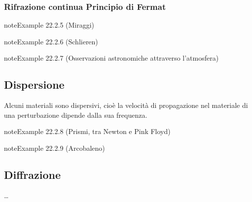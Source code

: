 \documentclass[letterpaper,10pt,italian]{jupyterBook}
\begin{document}
\subsubsection{Rifrazione continua \sphinxhyphen{} Principio di Fermat}
\label{\detokenize{ch/waves/optics-phenomena:rifrazione-continua-principio-di-fermat}}\label{ch/waves/optics-phenomena:example-4}
\begin{sphinxadmonition}{note}{Example 22.2.5 (Miraggi)}


\end{sphinxadmonition}
\label{ch/waves/optics-phenomena:example-5}
\begin{sphinxadmonition}{note}{Example 22.2.6 (Schlieren)}


\end{sphinxadmonition}
\label{ch/waves/optics-phenomena:example-6}
\begin{sphinxadmonition}{note}{Example 22.2.7 (Osservazioni astronomiche attraverso l’atmosfera)}


\end{sphinxadmonition}


\subsection{Dispersione}
\label{\detokenize{ch/waves/optics-phenomena:dispersione}}
\sphinxAtStartPar
Alcuni materiali sono dispersivi, cioè la velocità di propagazione nel materiale di una perturbazione dipende dalla sua frequenza.
\label{ch/waves/optics-phenomena:example-7}
\begin{sphinxadmonition}{note}{Example 22.2.8 (Prismi, tra Newton e Pink Floyd)}


\end{sphinxadmonition}
\label{ch/waves/optics-phenomena:example-8}
\begin{sphinxadmonition}{note}{Example 22.2.9 (Arcobaleno)}



\sphinxAtStartPar
{}

\sphinxAtStartPar
{}
\end{sphinxadmonition}


\subsection{Diffrazione}
\label{\detokenize{ch/waves/optics-phenomena:diffrazione}}
\sphinxAtStartPar
…
\end{document}
